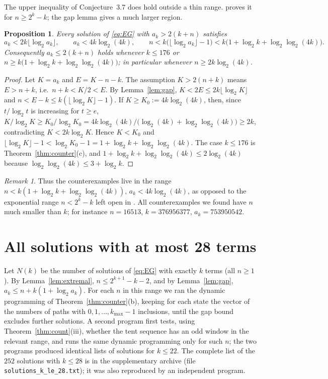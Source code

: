\documentclass[11pt]{amsart}
\newtheorem{proposition}[theorem]{Proposition}
\theoremstyle{definition}
\theoremstyle{remark}
\newtheorem{remark}[theorem]{Remark}
\begin{document}
The upper inequality of Conjecture~3.7 does hold outside a thin range. \cite[Rem.~3.8]{TUZ} proves it for $n\ge2^k-k$; the gap lemma gives a much larger region.

\begin{proposition}\label{prop:region}
Every solution of \eqref{eq:EG} with $a_k>2(k+n)$ satisfies
\[
a_k<2k\lfloor\log_2a_k\rfloor,\qquad a_k<4k\log_2(4k),\qquad n<k\bigl(\lfloor\log_2a_k\rfloor-1\bigr)<k\bigl(1+\log_2k+\log_2\log_2(4k)\bigr).
\]
Consequently $a_k\le2(k+n)$ holds whenever $k\le176$ or $n\ge k\bigl(1+\log_2k+\log_2\log_2(4k)\bigr)$; in particular whenever $n\ge 2k\log_2(4k)$.
\end{proposition}

\begin{proof}
Let $K=a_k$ and $E=K-n-k$. The assumption $K>2(n+k)$ means $E>n+k$, i.e.\ $n+k<K/2<E$. By Lemma~\ref{lem:gap}, $K<2E\le2k\lfloor\log_2K\rfloor$ and $n<E-k\le k(\lfloor\log_2K\rfloor-1)$. If $K\ge K_0:=4k\log_2(4k)$, then, since $t/\log_2t$ is increasing for $t\ge e$,
$K/\log_2K\ge K_0/\log_2K_0=4k\log_2(4k)/\bigl(\log_2(4k)+\log_2\log_2(4k)\bigr)\ge2k$, contradicting $K<2k\log_2K$. Hence $K<K_0$ and $\lfloor\log_2K\rfloor-1<\log_2K_0-1=1+\log_2k+\log_2\log_2(4k)$. The case $k\le176$ is Theorem~\ref{thm:counter}(c), and $1+\log_2k+\log_2\log_2(4k)\le2\log_2(4k)$ because $\log_2\log_2(4k)\le 3+\log_2 k$.
\end{proof}

\begin{remark}
Thus the counterexamples live in the range $n<k(1+\log_2k+\log_2\log_2(4k))$, $a_k<4k\log_2(4k)$, as opposed to the exponential range $n<2^k-k$ left open in \cite{TUZ}. All counterexamples we found have $n$ much smaller than $k$; for instance $n=16513$, $k=376956377$, $a_k=753950542$.
\end{remark}

\section{All solutions with at most 28 terms}\label{sec:Nk}

Let $N(k)$ be the number of solutions of \eqref{eq:EG} with exactly $k$ terms (all $n\ge1$). By Lemma~\ref{lem:extremal}, $n\le2^{k+1}-k-2$, and by Lemma~\ref{lem:gap}, $a_k\le n+k(1+\log_2a_k)$. For each $n$ in this range we ran the dynamic programming of Theorem~\ref{thm:counter}(b), keeping for each state the vector of the numbers of paths with $0,1,\dots,k_{\max}-1$ inclusions, until the gap bound excludes further solutions. A second program first tests, using Theorem~\ref{thm:count}(iii), whether the tent sequence has an odd window in the relevant range, and runs the same dynamic programming only for such $n$; the two programs produced identical lists of solutions for $k\le 22$. The complete list of the $252$ solutions with $k\le28$ is in the supplementary archive (file \texttt{solutions\_k\_le\_28.txt}); it was also reproduced by an independent program.
\end{document}
